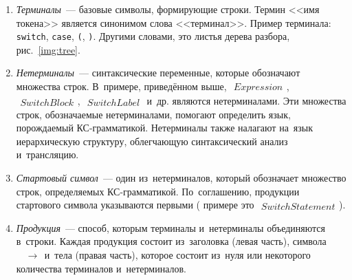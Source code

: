 \begin{enumerate} 
	\item{\textit{Терминалы}~--- базовые символы, формирующие строки. Термин <<имя токена>> является синонимом слова <<терминал>>. Пример терминала: \texttt{switch}, \texttt{case}, \texttt{(}, \texttt{)}}. Другими словами, это листья дерева разбора, рис.~\ref{img:tree}.
	\item{\textit{Нетерминалы}~--- синтаксические переменные, которые обозначают множества строк. В~примере, приведённом выше, $\begin{aligned} Expression \end{aligned}$, $\begin{aligned} SwitchBlock \end{aligned}$, $\begin{aligned} SwitchLabel \end{aligned}$ и~др. являются нетерминалами. Эти множества строк, обозначаемые нетерминалами, помогают определить язык, порождаемый КС-грамматикой. Нетерминалы также налагают на~язык иерархическую структуру, облегчающую синтаксический анализ и~трансляцию.}
	\item{\textit{Стартовый символ}~--- один из~нетерминалов, который обозначает множество строк, определяемых КС-грамматикой. По~соглашению, продукции стартового символа указываются первыми ( примере это $\begin{aligned} SwitchStatement \end{aligned}$).}
	\item{\textit{Продукция}~--- способ, которым терминалы и~нетерминалы объединяются в~строки. Каждая продукция состоит из~заголовка (левая часть), символа $\begin{aligned} &\to \end{aligned}$ и~тела (правая часть), которое состоит из~нуля или некоторого количества терминалов и~нетерминалов.}
\end{enumerate}

